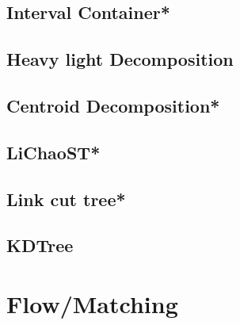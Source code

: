 \subsection{Interval Container*} %

% 
\subsection{Heavy light Decomposition}

\subsection{Centroid Decomposition*} %

% 
\subsection{LiChaoST*} %

\subsection{Link cut tree*} %

\subsection{KDTree}

% 


\section{Flow/Matching}
% 
% 
